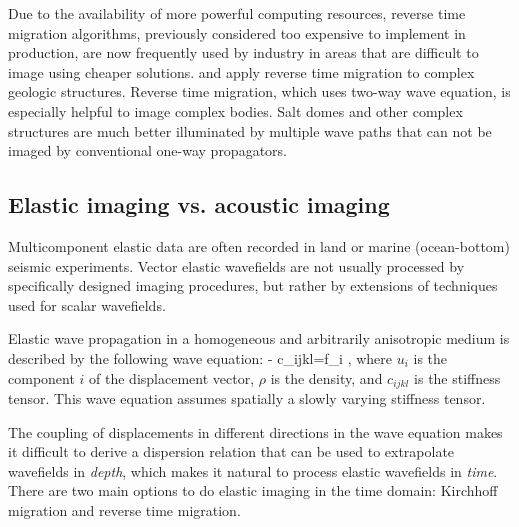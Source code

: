Due to the availability of more powerful computing resources, reverse time migration algorithms, previously considered too expensive to implement in production, are now frequently used by industry in areas that are difficult to image using cheaper solutions. 
\cite{jones:2140} and \cite{boechat:2427} apply reverse time migration to complex geologic structures. Reverse time migration, which uses two-way wave equation, is especially helpful to image complex bodies. Salt domes and other complex structures are much better illuminated by multiple wave paths that can not be imaged by conventional one-way propagators. 


\subsection{Elastic imaging vs. acoustic imaging }

Multicomponent elastic data are often recorded in land or marine (ocean-bottom) seismic experiments. Vector elastic wavefields are not usually processed by specifically designed imaging procedures, but rather by extensions of techniques used for scalar wavefields. 

Elastic wave propagation in a homogeneous and arbitrarily anisotropic medium is described by the following wave equation:
\def\u{u_x}
\def\w{u_z}
\def\dux{\frac{\partial \u}{\partial x } }
\def\duz{\frac{\partial \u}{\partial z } }
\def\dwx{\frac{\partial \w}{\partial x } }
\def\dwz{\frac{\partial \w}{\partial z } }
\beq
\label{eqn:EWE}
\rho{} - c_{ijkl}=f_i \; ,
\eeq
where $u_i$ is the component $i$ of the displacement vector, $\rho$ is the density, 
and $c_{ijkl}$ is the stiffness tensor.
This wave equation assumes spatially a slowly varying stiffness tensor.

The coupling of displacements in different directions in the wave equation  makes it difficult to derive a dispersion relation that can be used to extrapolate wavefields in \emph{depth}, which makes it natural to process elastic wavefields in \emph{time}. There are two main options to do elastic imaging in the time domain: Kirchhoff migration and reverse time migration. 


